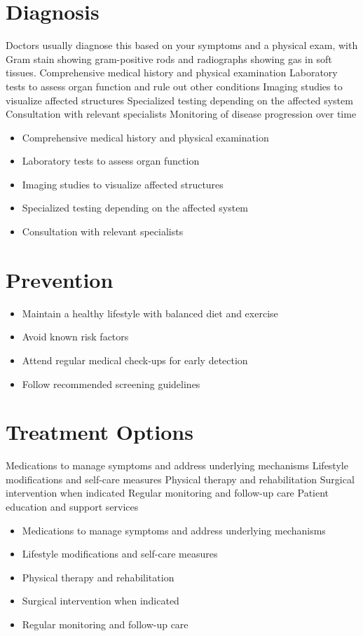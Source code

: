 \section{Diagnosis}
Doctors usually diagnose this based on your symptoms and a physical exam, with Gram stain showing gram-positive rods and radiographs showing gas in soft tissues. Comprehensive medical history and physical examination Laboratory tests to assess organ function and rule out other conditions Imaging studies to visualize affected structures Specialized testing depending on the affected system Consultation with relevant specialists Monitoring of disease progression over time

\begin{itemize}[noitemsep]
  \item Comprehensive medical history and physical examination
  \item Laboratory tests to assess organ function
  \item Imaging studies to visualize affected structures
  \item Specialized testing depending on the affected system
  \item Consultation with relevant specialists
\end{itemize}
\section{Prevention}
\begin{itemize}[noitemsep]
  \item Maintain a healthy lifestyle with balanced diet and exercise
  \item Avoid known risk factors
  \item Attend regular medical check-ups for early detection
  \item Follow recommended screening guidelines
\end{itemize}
\section{Treatment Options}
Medications to manage symptoms and address underlying mechanisms Lifestyle modifications and self-care measures Physical therapy and rehabilitation Surgical intervention when indicated Regular monitoring and follow-up care Patient education and support services

\begin{itemize}[noitemsep]
  \item Medications to manage symptoms and address underlying mechanisms
  \item Lifestyle modifications and self-care measures
  \item Physical therapy and rehabilitation
  \item Surgical intervention when indicated
  \item Regular monitoring and follow-up care
\end{itemize}
